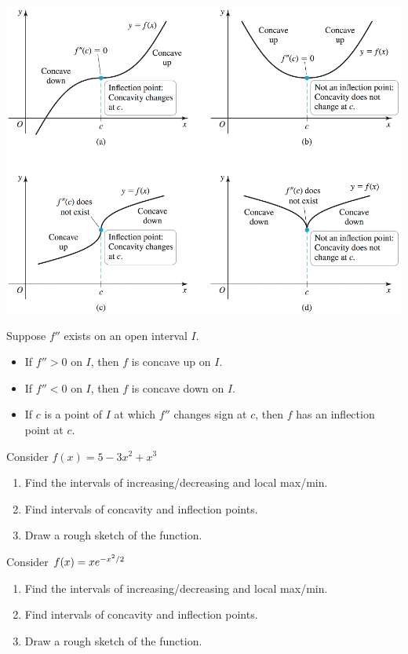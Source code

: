 \documentclass[mathNotesPreamble]{subfiles}
\begin{document}
\begin{center}
  \includegraphics[width=0.925\linewidth]{images/briggs_04_03/fig4_35.png}
\end{center}
\pagebreak

\begin{thmBox*}
  Suppose $f''$ exists on an open interval $I$.
  \begin{itemize}
    \item If $f''>0$ on $I$, then $f$ is concave up on $I$.
    \item If $f''<0$ on $I$, then $f$ is concave down on $I$.
    \item If $c$ is a point of $I$ at which $f''$ changes sign at $c$, then $f$ has an inflection point at $c$.
  \end{itemize}
\end{thmBox*}

\begin{ex*}
  Consider $f(x)=5-3x^2+x^3$
\end{ex*}
\begin{enumerate}[itemsep=\stretch{1}, label=\alph*)]
  \item Find the intervals of increasing/decreasing and local max/min.
  \item Find intervals of concavity and inflection points.
  \item Draw a rough sketch of the function.
\end{enumerate}
\pagebreak

\begin{ex*}
  Consider $f(x)=xe\inv[x^2/2]$
\end{ex*}
\begin{enumerate}[itemsep=\stretch{1}, label=\alph*)]
  \item Find the intervals of increasing/decreasing and local max/min.
  \item Find intervals of concavity and inflection points.
  \item Draw a rough sketch of the function.
\end{enumerate}
\pagebreak
\end{document}
